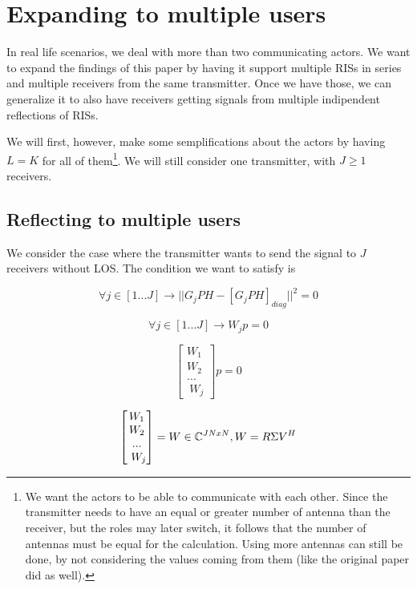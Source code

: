 \section{Expanding to multiple users}

In real life scenarios, we deal with more than two communicating actors. We want to expand the findings of this paper by having it support multiple RISs in series and multiple receivers from the same transmitter. Once we have those, we can generalize it to also have receivers getting signals from multiple indipendent reflections of RISs.

We will first, however, make some semplifications about the actors by having $L = K$ for all of them\footnote{We want the actors to be able to communicate with each other. Since the transmitter needs to have an equal or greater number of antenna than the receiver, but the roles may later switch, it follows that the number of antennas must be equal for the calculation. Using more antennas can still be done, by not considering the values coming from them (like the original paper did as well).}. We will still consider one transmitter, with $J \ge 1$ receivers.

\subsection{Reflecting to multiple users}

We consider the case where the transmitter wants to send the signal to $J$ receivers without LOS. The condition we want to satisfy is

\begin{equation}
  \forall j \in [1...J] \rightarrow || G_jPH - [G_jPH]_{diag} || ^2 = 0
\end{equation}

\begin{equation}
  \forall j \in [1...J] \rightarrow W_jp = 0
\end{equation}

\begin{equation}
  \begin{bmatrix}
    W_1  \\
    W_ 2 \\
    ...  \\\
    W_j
  \end{bmatrix}
  p = 0
\end{equation}

\begin{equation}
  \begin{bmatrix}
    W_1  \\
    W_ 2 \\
    ...  \\\
    W_j
  \end{bmatrix}
  = W \in \mathbb{C} ^ {JNxN}, W = R \Sigma V^H
\end{equation}

